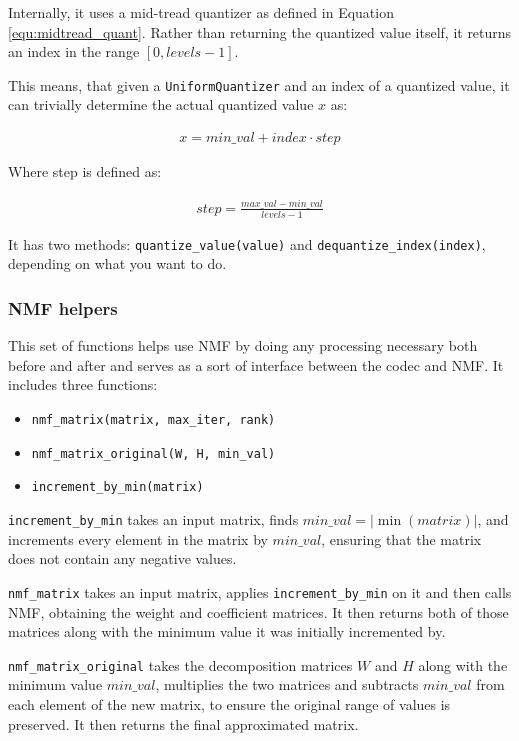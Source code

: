 Internally, it uses a mid-tread quantizer as defined in Equation \ref{equ:midtread_quant}. Rather than returning the quantized value itself, it returns an index in the range $[0, levels-1]$.

This means, that given a \verb|UniformQuantizer| and an index of a quantized value, it can trivially determine the actual quantized value $x$ as:

\begin{align}
x = min\_val + index \cdot step
\end{align}

Where step is defined as:

\begin{align}
step = \frac{max\_val - min\_val}{levels - 1}
\end{align}

It has two methods: \verb|quantize_value(value)| and \verb|dequantize_index(index)|, depending on what you want to do.

\subsubsection{NMF helpers}
This set of functions helps use NMF by doing any processing necessary both before and after and serves as a sort of interface between the codec and NMF. It includes three functions:

\begin{itemize}
	\item \verb|nmf_matrix(matrix, max_iter, rank)|
	\item \verb|nmf_matrix_original(W, H, min_val)|
	\item \verb|increment_by_min(matrix)|
\end{itemize}

\verb|increment_by_min| takes an input matrix, finds $min\_val = |\min(matrix)|$, and increments every element in the matrix by $min\_val$, ensuring that the matrix does not contain any negative values.

\verb|nmf_matrix| takes an input matrix, applies \verb|increment_by_min| on it and then calls NMF, obtaining the weight and coefficient matrices. It then returns both of those matrices along with the minimum value it was initially incremented by.

\verb|nmf_matrix_original| takes the decomposition matrices $W$ and $H$ along with the minimum value $min\_val$, multiplies the two matrices and subtracts $min\_val$ from each element of the new matrix, to ensure the original range of values is preserved. It then returns the final approximated matrix.

